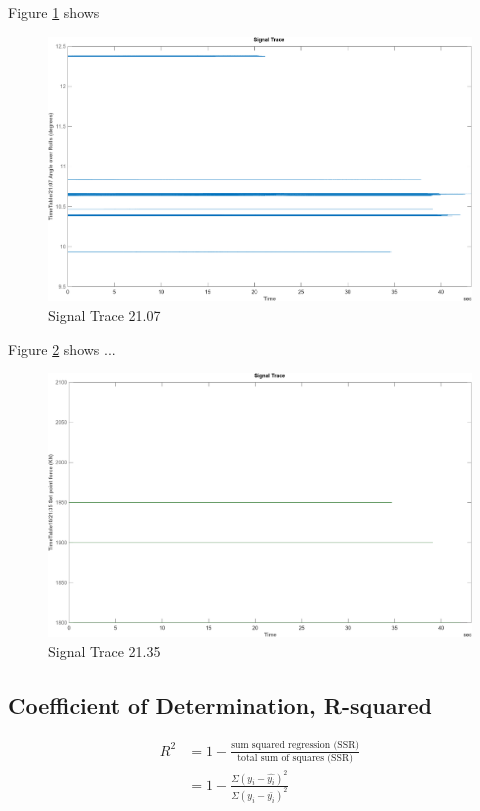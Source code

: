 \documentclass{article}
\begin{document}
Figure \ref{fig:SignalTrace21.07} shows 
\begin{figure}[H]
    \centering
    \includegraphics[width=\textwidth, height=\textheight, keepaspectratio]{figures/SignalTrace21.07.png}
    \caption{Signal Trace 21.07}
    \label{fig:SignalTrace21.07}
\end{figure}

Figure \ref{fig:SignalTrace21.35} shows ...
\begin{figure}[H]
    \centering
    \includegraphics[width=\textwidth, height=\textheight, keepaspectratio]{figures/SignalTrace21.35.png}
    \caption{Signal Trace 21.35}
    \label{fig:SignalTrace21.35}
\end{figure}
\subsection{Coefficient of Determination, R-squared}
\begin{align*}
 R^2 &= 1 - \frac{\textrm{sum squared regression (SSR)}}{\textrm{total sum of squares (SSR)}} \\ 
 &= 1 - \frac{\Sigma(y_i - \hat{y_i})^2}{\Sigma(y_i - \bar{y_i})^2} 
\end{align*}
\end{document}
